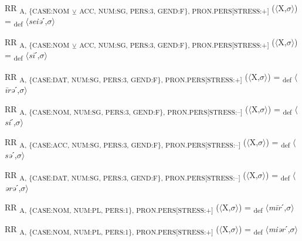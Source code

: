 {\begin{exe}
 RR \textsubscript{A, \{CASE:NOM} \textsubscript{${\veebar}$}\textsubscript{ ACC, NUM:SG, PERS:3, GEND:F\}, PRON.PERS[STRESS:+]} ($\langle$X,$\sigma $$\rangle$) = \textsubscript{def} $\langle$\textit{seiə}ˊ,$\sigma $$\rangle$
\end{exe}

\begin{exe}
 RR \textsubscript{A, \{CASE:NOM} \textsubscript{${\veebar}$}\textsubscript{ ACC, NUM:SG, PERS:3, GEND:F\}, PRON.PERS[STRESS:+]} ($\langle$X,$\sigma $$\rangle$) = \textsubscript{def} $\langle$\textit{s\=i}ˊ,$\sigma $$\rangle$
\end{exe}

\begin{exe}
 RR \textsubscript{A, \{CASE:DAT, NUM:SG, PERS:3, GEND:F\}, PRON.PERS[STRESS:+]} ($\langle$X,$\sigma $$\rangle$) = \textsubscript{def} $\langle$\textit{\=irə}ˊ,$\sigma $$\rangle$
\end{exe}

\begin{exe}
 RR \textsubscript{A, \{CASE:NOM, NUM:SG, PERS:3, GEND:F\}, PRON.PERS[STRESS:–]} ($\langle$X,$\sigma $$\rangle$) = \textsubscript{def} $\langle$\textit{si}ˊ,$\sigma $$\rangle$
\end{exe}

\begin{exe}
 RR \textsubscript{A, \{CASE:ACC, NUM:SG, PERS:3, GEND:F\}, PRON.PERS[STRESS:–]} ($\langle$X,$\sigma $$\rangle$) = \textsubscript{def} $\langle$\textit{sə}ˊ,$\sigma $$\rangle$
\end{exe}

\begin{exe}
 RR \textsubscript{A, \{CASE:DAT, NUM:SG, PERS:3, GEND:F\}, PRON.PERS[STRESS:–]} ($\langle$X,$\sigma $$\rangle$) = \textsubscript{def} $\langle$\textit{ərə}ˊ,$\sigma $$\rangle$
\end{exe}

\begin{exe}
 RR \textsubscript{A, \{CASE:NOM, NUM:PL, PERS:1\}, PRON.PERS[STRESS:+]} ($\langle$X,$\sigma $$\rangle$) = \textsubscript{def} $\langle$\textit{m\=ir}ˊ,$\sigma $$\rangle$
\end{exe}

\begin{exe}
 RR \textsubscript{A, \{CASE:NOM, NUM:PL, PERS:1\}, PRON.PERS[STRESS:+]} ($\langle$X,$\sigma $$\rangle$) = \textsubscript{def} $\langle$\textit{miər}ˊ,$\sigma $$\rangle$
\end{exe}

}
